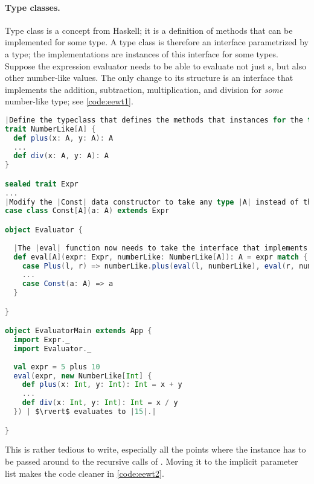 \documentclass[10 pt]{article}
\begin{document}
\paragraph{Type classes.} Type class is a concept from Haskell\cite{haskell}; it is a definition of methods that can be implemented for some type. A type class is therefore an interface parametrized by a type; the implementations are instances of this interface for some types. Suppose the expression evaluator needs to be able to evaluate not just s, but also other number-like values. The only change to its structure is an interface that implements the addition, subtraction, multiplication, and division for \emph{some} number-like type; see \autoref{code:eewt1}.

\begin{lstlisting}[caption={Expression evaluator without typeclasses}, label={code:eewt1}, language=Scala, escapechar=|]
|Define the typeclass that defines the methods that instances for the type |A| must implement.|
trait NumberLike[A] {
  def plus(x: A, y: A): A
  ...
  def div(x: A, y: A): A
}

sealed trait Expr
...
|Modify the |Const| data constructor to take any type |A| instead of the concrete |Int|.|
case class Const[A](a: A) extends Expr

object Evaluator {
 
  |The |eval| function now needs to take the interface that implements the number-like behaviour for type |A|.| 
  def eval[A](expr: Expr, numberLike: NumberLike[A]): A = expr match {
    case Plus(l, r) => numberLike.plus(eval(l, numberLike), eval(r, numberLike))
    ...
    case Const(a: A) => a
  }

}

object EvaluatorMain extends App {
  import Expr._
  import Evaluator._
  
  val expr = 5 plus 10
  eval(expr, new NumberLike[Int] {
    def plus(x: Int, y: Int): Int = x + y
    ...
    def div(x: Int, y: Int): Int = x / y
  }) | $\rvert$ evaluates to |15|.|

}
\end{lstlisting}

This is rather tedious to write, especially all the points where the  instance has to be passed around to the recursive calls of . Moving it to the implicit parameter list makes the code cleaner in \autoref{code:eewt2}.
\end{document}
